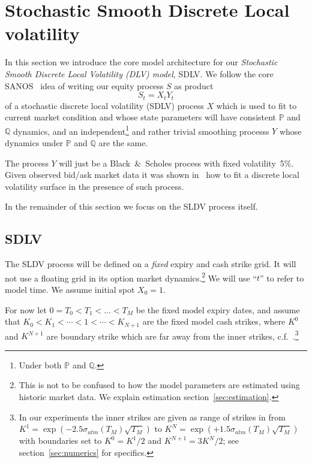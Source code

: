 \documentclass[11pt]{article}
\newcommand{\Q}{\mathbb Q}
\newcommand{\PP}{\mathbb P}
\theoremstyle{plain}
\theoremstyle{definition}
\theoremstyle{remark}
\begin{document}
{\section{Stochastic Smooth Discrete Local volatility}

In this section we introduce the core model architecture for our \emph{Stochastic Smooth Discrete Local Volatility (DLV) model}, SDLV.
We follow the core SANOS~\cite{SANOS2026} idea of writing our equity process $S$ as product
\begin{equation}
 \label{eq:S} 
  S_t = X_t Y_t 
\end{equation}
of a stochastic discrete local volatility (SDLV) process $X$ which is used to fit to current market condition and 
whose state parameters will have consistent $\PP$ and $\Q$ dynamics, and an independent\footnote{Under both $\PP$ and $\Q$.} and rather trivial smoothing processs $Y$ whose dynamics under $\PP$ and $\Q$ are the same.

The process $Y$ will just be a Black~\&~Scholes process with fixed volatility~5\%. Given observed bid/ask market data it was shown in~\cite{SANOS2026} how to fit
a discrete local volatility surface in the presence of such process. 

In the remainder of this section we focus on the SLDV process itself.

\subsection{SDLV}

The SLDV process will be defined on a \emph{fixed} expiry and cash strike grid. It will not use a floating grid in its option market dynamics.\footnote{This is not to be confused to 
how the model parameters are estimated using historic market data. We explain estimation section~\ref{sec:estimation}.} We will use ``$t$'' to refer to model time. We assume initial 
spot $X_0=1$.

For now let $0=T_0<T_1<\dots<T_M$ be the fixed model expiry dates, and assume that $K_0<K_1<\cdots<1<\cdots<K_{N+1}$ are the fixed model cash strikes, where $K^0$ and $K^{N+1}$
are boundary strike which are far away from the inner strikes, c.f.~\cite{SANOS2026}.\footnote{In our experiments the inner strikes are given as range of strikes
in from $K^1=\exp(-2.5 \sigma_{atm}(T_M) \sqrt{T_M})$ to $K^N=\exp(+1.5 \sigma_{atm}(T_M) \sqrt{T_M})$ with boundaries set to $K^0=K^1/2$ and $K^{N+1}=3 K^N / 2$; see
section~\ref{sec:numerics} for specifics.
}

}
\end{document}
